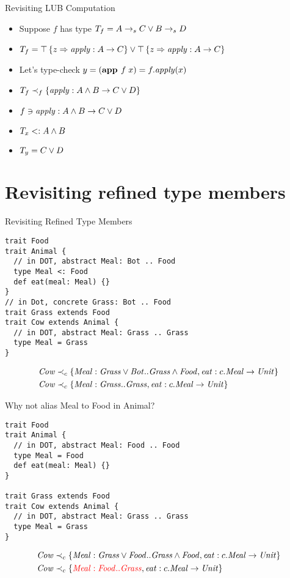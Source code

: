 \documentclass{beamer}
\begin{document}
\begin{frame}[fragile]{Revisiting LUB Computation}
\begin{itemize}
\item Suppose $f$ has type ${T_f} = {A\rightarrow_sC} \vee {B\rightarrow_sD}$
\item $T_f = {\top \left\{z \Rightarrow \mathit{apply} : A \rightarrow C \right\}} \vee {\top\left\{z \Rightarrow \mathit{apply} : A \rightarrow C \right\}}$
\item Let's type-check $y = (\textbf{app }f\;x) = f.\mathit{apply}(x)$
\item $T_f \prec_f \{\mathit{apply} : A \wedge B \rightarrow C \vee D\}$
\item $f \ni {\mathit{apply} : A \wedge B \rightarrow C \vee D}$
\item $T_x <: A \wedge B$
\item $T_y = C \vee D$
\end{itemize}
\end{frame}

\section{Revisiting refined type members}

\begin{frame}[fragile]{Revisiting Refined Type Members}
\begin{verbatim}
trait Food
trait Animal {
  // in DOT, abstract Meal: Bot .. Food
  type Meal <: Food
  def eat(meal: Meal) {}
}
// in Dot, concrete Grass: Bot .. Food
trait Grass extends Food
trait Cow extends Animal {
  // in DOT, abstract Meal: Grass .. Grass
  type Meal = Grass
}
\end{verbatim}
\begin{align*}
{\mathit{Cow}} &\prec_c \{{\mathit{Meal} : {\mathit{Grass}} \vee {\mathit{Bot}}..{\mathit{Grass}} \wedge {\mathit{Food}}}, {\mathit{eat} : c.\mathit{Meal} \rightarrow \mathit{Unit}}\}\\
{\mathit{Cow}} &\prec_c \{{\mathit{Meal} : {\mathit{Grass}}..{\mathit{Grass}}}, {\mathit{eat} : c.\mathit{Meal} \rightarrow \mathit{Unit}}\}
\end{align*}
\end{frame}

\begin{frame}[fragile]{Why not alias Meal to Food in Animal?}
\begin{verbatim}
trait Food
trait Animal {
  // in DOT, abstract Meal: Food .. Food
  type Meal = Food
  def eat(meal: Meal) {}
}

trait Grass extends Food
trait Cow extends Animal {
  // in DOT, abstract Meal: Grass .. Grass
  type Meal = Grass
}
\end{verbatim}
\begin{align*}
{\mathit{Cow}} &\prec_c \{{\mathit{Meal} : {\mathit{Grass}} \vee {\mathit{Food}}..{\mathit{Grass}} \wedge {\mathit{Food}}}, {\mathit{eat} : c.\mathit{Meal} \rightarrow \mathit{Unit}}\}\\
{\mathit{Cow}} &\prec_c \{{\color{red}{\mathit{Meal} : {\mathit{Food}}..{\mathit{Grass}}}}, {\mathit{eat} : c.\mathit{Meal} \rightarrow \mathit{Unit}}\}
\end{align*}
\end{frame}
\end{document}
